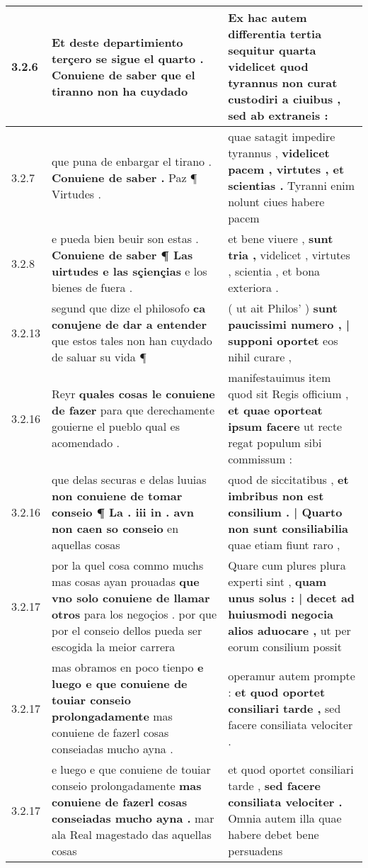 \begin{tabular}{|p{1cm}|p{6.5cm}|p{6.5cm}|}
3.2.6 & Et deste departimiento terçero se sigue el quarto . \textbf{ Conuiene de saber } que el tiranno non ha cuydado & Ex hac autem differentia tertia \textbf{ sequitur quarta videlicet quod tyrannus non curat custodiri a ciuibus , } sed ab extraneis : \\\hline
3.2.7 & que puna de enbargar el tirano . \textbf{ Conuiene de saber . } Paz ¶ Virtudes . & quae satagit impedire tyrannus , \textbf{ videlicet pacem , virtutes , et scientias . } Tyranni enim nolunt ciues habere pacem \\\hline
3.2.8 & e pueda bien beuir son estas . \textbf{ Conuiene de saber ¶ Las uirtudes e las sçiençias } e los bienes de fuera . & et bene viuere , \textbf{ sunt tria , } videlicet , virtutes , scientia , et bona exteriora . \\\hline
3.2.13 & segund que dize el philosofo \textbf{ ca conujene de dar a entender } que estos tales non han cuydado de saluar su vida ¶ & ( ut ait Philos’ ) \textbf{ sunt paucissimi numero , | supponi oportet } eos nihil curare , \\\hline
3.2.16 & Reyr \textbf{ quales cosas le conuiene de fazer } para que derechamente gouierne el pueblo qual es acomendado . & manifestauimus item quod sit Regis officium , \textbf{ et quae oporteat ipsum facere } ut recte regat populum sibi commissum : \\\hline
3.2.16 & que delas securas e delas luuias \textbf{ non conuiene de tomar conseio ¶ La . iii in . avn non caen so conseio } en aquellas cosas & quod de siccitatibus , \textbf{ et imbribus non est consilium . | Quarto non sunt consiliabilia } quae etiam fiunt raro , \\\hline
3.2.17 & por la quel cosa commo muchs mas cosas ayan prouadas \textbf{ que vno solo conuiene de llamar otros } para los negoçios . por que por el conseio dellos pueda ser escogida la meior carrera & Quare cum plures plura experti sint , \textbf{ quam unus solus : | decet ad huiusmodi negocia alios aduocare , } ut per eorum consilium possit \\\hline
3.2.17 & mas obramos en poco tienpo \textbf{ e luego e que conuiene de touiar conseio prolongadamente } mas conuiene de fazerl cosas conseiadas mucho ayna . & operamur autem prompte : \textbf{ et quod oportet consiliari tarde , } sed facere consiliata velociter . \\\hline
3.2.17 & e luego e que conuiene de touiar conseio prolongadamente \textbf{ mas conuiene de fazerl cosas conseiadas mucho ayna . } mar ala Real magestado das aquellas cosas & et quod oportet consiliari tarde , \textbf{ sed facere consiliata velociter . } Omnia autem illa quae habere debet bene persuadens \\\hline

\end{tabular}
